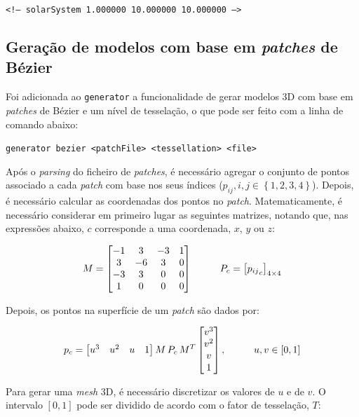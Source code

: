 \documentclass[12pt, a4paper]{article}
\begin{document}
\begin{center}
    \texttt{<!-- solarSystem 1.000000 10.000000 10.000000 -->}
\end{center}

\subsection{Geração de modelos com base em \emph{patches} de Bézier}

Foi adicionada ao \texttt{generator} a funcionalidade de gerar modelos 3D com base em \emph{patches}
de Bézier e um nível de tesselação, o que pode ser feito com a linha de comando abaixo:

\begin{center}
    \texttt{generator bezier <patchFile> <tessellation> <file>}
\end{center}

Após o \emph{parsing} do ficheiro de \emph{patches}, é necessário agregar o conjunto de pontos
associado a cada \emph{patch} com base nos seus índices
($p_{i j}, i, j \in \left \lbrace 1,2,3,4 \right \rbrace$). Depois, é necessário calcular as
coordenadas dos pontos no \emph{patch}. Matematicamente, é necessário considerar em primeiro lugar
as seguintes matrizes, notando que, nas expressões abaixo, $c$ corresponde a uma coordenada, $x$,
$y$ ou $z$:

$$
\def\arraystretch{1}
M =
\begin{bmatrix}
    -1 &  3 & -3 & 1 \\
     3 & -6 &  3 & 0 \\
    -3 &  3 &  0 & 0 \\
     1 &  0 &  0 & 0
\end{bmatrix}
\hspace{1cm}
P_c = \left [ {p_{i j}}_{c} \right ] _ {4 \times 4}
$$

Depois, os pontos na superfície de um \emph{patch} são dados por:

$$
\def\arraystretch{1}
p_c =
\begin{bmatrix}
    u^3 & u^2 & u & 1
\end{bmatrix}
M \, P_c \, M^T
\begin{bmatrix}
    v^3 \\ v^2 \\ v \\ 1
\end{bmatrix},
\hspace{1cm}
u, v \in \left [ 0, 1 \right ]
$$

Para gerar uma \emph{mesh} 3D, é necessário discretizar os valores de $u$ e de $v$. O intervalo
$\left [ 0, 1 \right ]$ pode ser dividido de acordo com o fator de tesselação, $T$:
\end{document}
